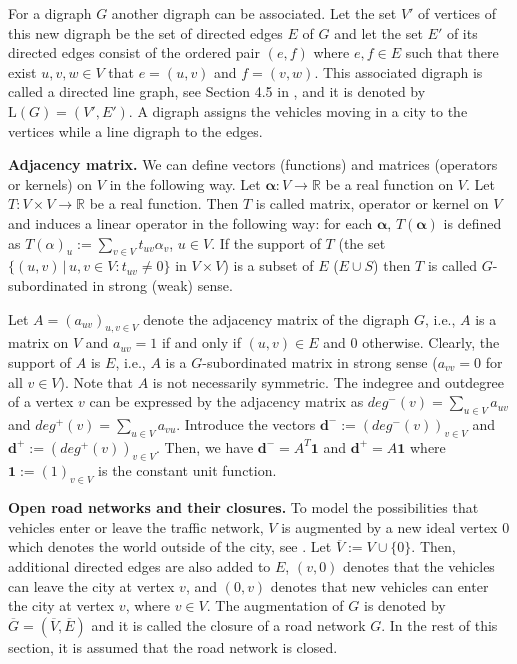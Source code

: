 \documentclass[b5paper,12pt]{report}
\theoremstyle{definition}
\newcommand{\bd}{\boldsymbol{d}}
\newcommand{\balpha}{\boldsymbol{\alpha}}
\begin{document}
For a digraph $G$ another digraph can be associated. Let the set $V'$ of vertices of this new digraph be the set of directed edges $E$ of $G$ and let the set $E'$ of its directed edges consist of the ordered pair $(e, f)$ where $e, f \in E$ such that there exist $u, v, w \in V$ that $e = (u, v)$ and $f = (v, w)$. This associated digraph is called a directed line graph, see Section 4.5 in \cite{JensenGutin2007}, and it is denoted by $\text{L}(G) = (V', E')$. A digraph assigns the vehicles moving in a city to the vertices while a line digraph to the edges.

\smallskip

\textbf{Adjacency matrix.} We can define vectors (functions) and matrices (operators or kernels) on $V$ in the following way. Let $\balpha: V\to \mathbb{R}$ be a real function on $V$. Let $T:V\times V\to \mathbb{R}$ be a real function. Then $T$ is called matrix, operator or kernel on $V$ and induces a linear operator in the following way: for each $\balpha$, $T(\balpha)$ is defined as $T(\alpha)_u := \sum_{v\in V} t_{uv} \alpha_v$, $u\in V$. If the support of $T$ (the set $\{(u,v)\,|\, u,v\in V: t_{uv}\neq 0\}$ in $V\times V$) is a subset of $E$ ($E\cup S$) then $T$ is called $G$-subordinated in strong (weak) sense. 

Let $A = (a_{uv})_{u,v\in V} $ denote the adjacency matrix of the digraph $G$, i.e., $A$ is a matrix on $V$ and $a_{uv} = 1$ if and only if $(u,v) \in E$ and $0$ otherwise. Clearly, the support of $A$ is $E$, i.e., $A$ is a $G$-subordinated matrix in strong sense ($a_{vv} = 0$ for all $v \in V$). Note that $A$ is not necessarily symmetric. The indegree and outdegree of a vertex $v$ can be expressed by the adjacency matrix as $deg^{−}(v) = \sum_{u \in V} a_{uv}$ and $deg^{+}(v) = \sum_{u\in V} a_{vu}$. Introduce the vectors $\bd^{−} := (deg^{−}(v))_{v\in V}$ and $\bd^{+} := (deg^{+}(v))_{v \in V}$. Then, we have $\bd^{−} = A^T\textbf{1}$ and $\bd^{+} = A\textbf{1}$ where $\textbf{1} := (1)_{v \in V}$ is the constant unit function.

\smallskip

\textbf{Open road networks and their closures.} To model the possibilities that vehicles enter or leave the traffic network, $V$ is augmented by a new ideal vertex 0 which denotes the world outside of the city, see \cite{Faizrahetal2013}. Let $\overline{V} := V \cup \{0\}$. Then, additional directed edges are also added to $E$, $(v, 0)$ denotes that the vehicles can leave the city at vertex $v$, and $(0, v)$ denotes that new vehicles can enter the city at vertex $v$, where $v \in V$. The augmentation of $G$ is denoted by $\overline{G} = (\overline{V}, \overline{E})$ and it is called the closure of a road network $G$. In the rest of this section, it is assumed that the road network is closed. 
\end{document}
